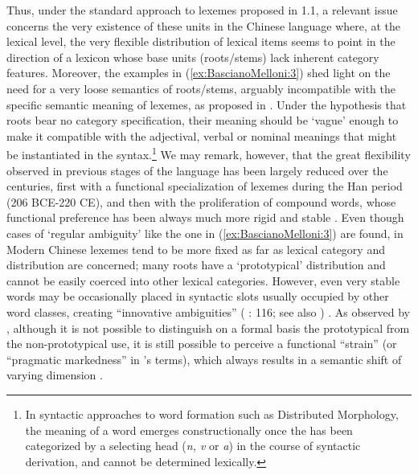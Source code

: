 \documentclass[output=paper]{langsci/langscibook}
\begin{document}
Thus, under the standard approach to lexemes proposed in 1.1, a relevant
issue concerns the very existence of these units in the Chinese language
where, at the lexical level, the very flexible distribution of lexical
items seems to point in the direction of a lexicon whose base units
(roots/stems) lack inherent category features. Moreover, the examples in
(\ref{ex:BascianoMelloni:3}) shed light on the need for a very loose semantics of roots/stems,
arguably incompatible with the specific semantic meaning of lexemes, as
proposed in %
\citet{Fradin03b}%
%
. Under the hypothesis that roots
bear no category specification, their meaning should be `vague' enough
to make it compatible with the adjectival, verbal or nominal meanings
that might be instantiated in the syntax.\footnote{In syntactic
  approaches to word formation such as Distributed Morphology, the
  meaning of a word emerges constructionally once the  has been
  categorized by a selecting head (\emph{n, v} or \emph{a}) in the
  course of syntactic derivation, and cannot be determined lexically.}
We may remark, however, that the great flexibility observed in previous
stages of the language has been largely reduced over the centuries,
first with a functional specialization of lexemes during the Han period
(206 BCE-220 CE), and then with the proliferation of compound words,
whose functional preference has been always much more rigid and stable
%
\citep[see][]{Zadrapa2017}%
%
. Even though cases of `regular ambiguity' like the
one in (\ref{ex:BascianoMelloni:3}) are found, in Modern Chinese lexemes tend to be more fixed as
far as lexical category and distribution are concerned; many roots have
a `prototypical' distribution and cannot be easily coerced into other
lexical categories. However, even very stable words may be occasionally
placed in syntactic slots usually occupied by other word classes,
creating ``innovative ambiguities'' %
(%
\citealt{KwongTsou2003}%
%
: 116; see also
\citealt{Basciano2017}%
%
)
%
. As observed by %
\citet{Zadrapa2017}%
%
, although it is not
possible to distinguish on a formal basis the prototypical from the
non-prototypical use, it is still possible to perceive a functional
``strain'' (or ``pragmatic markedness'' in %
\citeauthor{Bisang2008a}'s \citeyear{Bisang2008a} %
 terms), which
always results in a semantic shift of varying dimension %
\citep[see][73]{Croft2001}%
%
.
\end{document}

